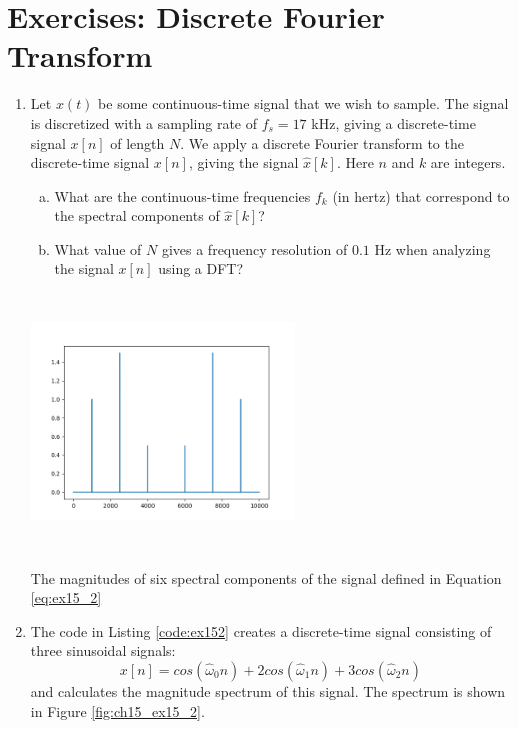 \newpage
\section{Exercises: Discrete Fourier Transform}

\begin{enumerate}
\item Let $x(t)$ be some continuous-time signal that we wish to sample. The signal is discretized with a sampling rate of $f_{s}=17$ kHz, giving a discrete-time signal $x[n]$ of length $N$. We apply a discrete Fourier transform to the discrete-time signal $x[n]$, giving the signal $\hat{x}[k]$. Here $n$ and $k$ are integers.

\begin{enumerate}[a)]
    \item What are the continuous-time frequencies $f_{k}$ (in hertz) that correspond to the spectral components of $\hat{x}[k]$?
    
    \item What value of $N$ gives a frequency resolution of $0.1$ Hz when analyzing the signal $x[n]$ using a DFT?
\end{enumerate}

\begin{marginfigure}
\includegraphics[width=7.0cm,height=6.8cm]{ch15/figures/ex152.png}
\caption{The magnitudes of six spectral components of the signal defined in Equation \ref{eq:ex15_2}}
\label{fig:ch15_ex15_2}
\end{marginfigure}

\item The code in Listing \ref{code:ex152} creates a discrete-time signal consisting of three sinusoidal signals:
\begin{equation}
x[n]=cos(\hat{\omega}_0 n)+2cos(\hat{\omega}_1 n)+3cos(\hat{\omega}_2 n)
\label{eq:ex15_2}
\end{equation}
and calculates the magnitude spectrum of this signal. The spectrum is shown in Figure \ref{fig:ch15_ex15_2}.


\end{enumerate}
